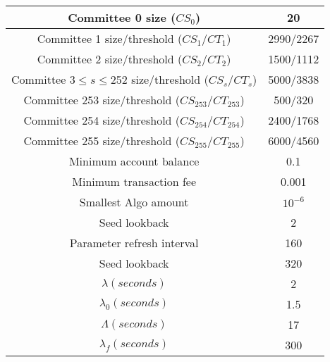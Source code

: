 \documentclass[../main.tex]{subfiles}
\begin{document}
\begin{center}
\begin{tabular}{ |c|c| } 
 \hline
 Committee 0 size ($CS_0$) & 20 \\ 
 \hline
 Committee 1 size/threshold ($CS_1/CT_1$) & 2990/2267 \\ 
 \hline
 Committee 2 size/threshold ($CS_2/CT_2$) & 1500/1112 \\ 
 \hline
 Committee 3$\leq s \leq$252 size/threshold ($CS_s/CT_s$) &  5000/3838 \\ 
 \hline
 Committee 253 size/threshold ($CS_{253}/CT_{253}$) & 500/320 \\ 
 \hline
 Committee 254 size/threshold ($CS_{254}/CT_{254}$) & 2400/1768 \\ 
 \hline
 Committee 255 size/threshold ($CS_{255}/CT_{255}$) & 6000/4560 \\ 
 \hline
 Minimum account balance & 0.1\\
 \hline
 Minimum transaction fee & 0.001\\
 \hline
 Smallest Algo amount & $10^{-6}$\\
 \hline
 Seed lookback & 2\\
 \hline
 Parameter refresh interval & 160\\
 \hline
 Seed lookback & 320\\
 \hline
 $\lambda (seconds)$ & 2\\
 \hline
 $\lambda_0 (seconds)$ & 1.5\\
 \hline
 $\Lambda (seconds)$ & 17\\
 \hline
 $\lambda_f (seconds)$ & 300\\
 \hline
\end{tabular}
\end{center}
\end{document}
